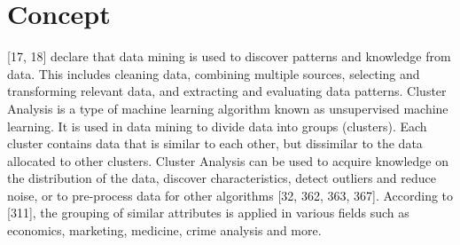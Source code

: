 \documentclass[12pt,a4paper]{article}
\title{\titlename}
\author{ \authorid\\ \scriptsize \address }
\date{\exposedate}
\begin{document}

\maketitle

\section*{Concept}
\textcite{han2011data}[17, 18] declare that data mining is used to discover patterns and knowledge from data. This includes cleaning data, combining multiple sources, selecting and transforming relevant data, and extracting and evaluating data patterns.
Cluster Analysis is a type of machine learning algorithm known as unsupervised machine learning. It is used in data mining to divide data into groups (clusters). Each cluster contains data that is similar to each other, but dissimilar to the data allocated to other clusters. Cluster Analysis can be used to acquire knowledge on the distribution of the data, discover characteristics, detect outliers and reduce noise, or to pre-process data for other algorithms \autocite{han2011data}[32, 362, 363, 367]. According to \textcite{bramer2007principles}[311], the grouping of similar attributes is applied in various fields such as economics, marketing, medicine, crime analysis and more.
\end{document}
